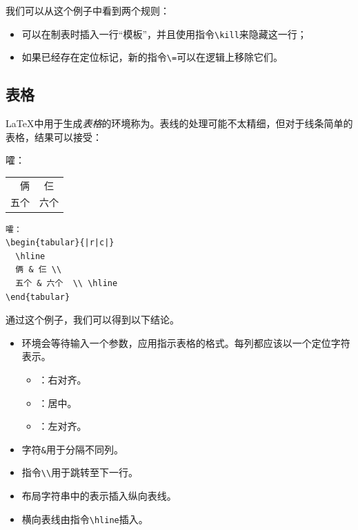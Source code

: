 我们可以从这个例子中看到两个规则：

\begin{itemize}
    \item 可以在制表时插入一行“模板”，并且使用指令\verb|\kill|来隐藏这一行；
    \item 如果已经存在定位标记，新的指令\verb|\=|可以在逻辑上移除它们。
\end{itemize}

\subsection{表格}

\LaTeX 中用于生成\emph{表格}的环境称为。表线的处理可能不太精细，但对于线条简单的表格，结果可以接受：

\begin{codelist}[2.11]{
    嚯：
    \begin{tabular}{|r|c|}
        \hline
        俩 & 仨 \\
        五个 & 六个  \\ \hline
      \end{tabular}
}\begin{verbatim}嚯：
\begin{tabular}{|r|c|}
  \hline
  俩 & 仨 \\
  五个 & 六个  \\ \hline
\end{tabular}
\end{verbatim}
\end{codelist}
通过这个例子，我们可以得到以下结论。

\begin{itemize}
    \item 环境会等待输入一个参数，应用指示表格的格式。每列都应该以一个定位字符表示。
    \begin{itemize}
        \item {}：右对齐。
        \item {}：居中。
        \item {}：左对齐。
    \end{itemize}
    \item 字符\verb|&|用于分隔不同列。
    \item 指令\verb|\\|用于跳转至下一行。
    \item 布局字符串中的\dm{|}表示插入纵向表线。
    \item 横向表线由指令\verb|\hline|插入。
\end{itemize}

